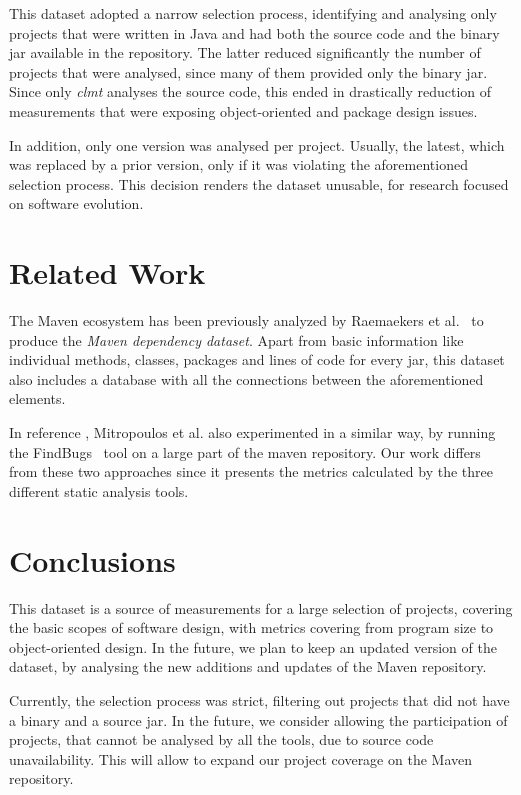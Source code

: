 \documentclass{sig-alternate}
\begin{document}
This dataset adopted a narrow selection process, identifying and analysing only projects that were written in Java and had both the source code and the binary {\sc jar} available in the repository. The latter reduced significantly the number of projects that were analysed, since many of them provided only the binary {\sc jar}. Since only \textit{clmt} analyses the source code, this ended in drastically reduction of measurements that were exposing object-oriented and package design issues.

In addition, only one version was analysed per project. Usually, the latest, which was replaced by a prior version, only if it was violating the aforementioned selection process. This decision renders the dataset unusable, for research focused on software evolution.

\section{Related Work}
\label{sec:rel}

The Maven ecosystem has been previously analyzed by Raemaekers et al.~\cite{RDV13} to produce the {\it Maven dependency dataset}. Apart from basic information like individual methods, classes, packages and lines of code for every {\sc jar}, this dataset also includes a database with all the connections between the aforementioned elements.

In reference \cite{MKLGS14}, Mitropoulos et al. also experimented in a similar way, by running the FindBugs~\cite{HP04} tool on a large part of the maven repository. Our work differs from these two approaches since it presents the metrics calculated by the three different static analysis tools.

\section{Conclusions}
\label{sec:conc}

This dataset is a source of measurements for a large selection of projects, covering the basic scopes of software design, with metrics covering from program size to object-oriented design. In the future, we plan to keep an updated version of the dataset, by analysing the new additions and updates of the Maven repository.

Currently, the selection process was strict, filtering out projects that did not have a binary and a source {\sc jar}. In the future, we consider allowing the participation of projects, that cannot be analysed by all the tools, due to source code unavailability. This will allow to expand our project coverage on the Maven repository.
\end{document}

